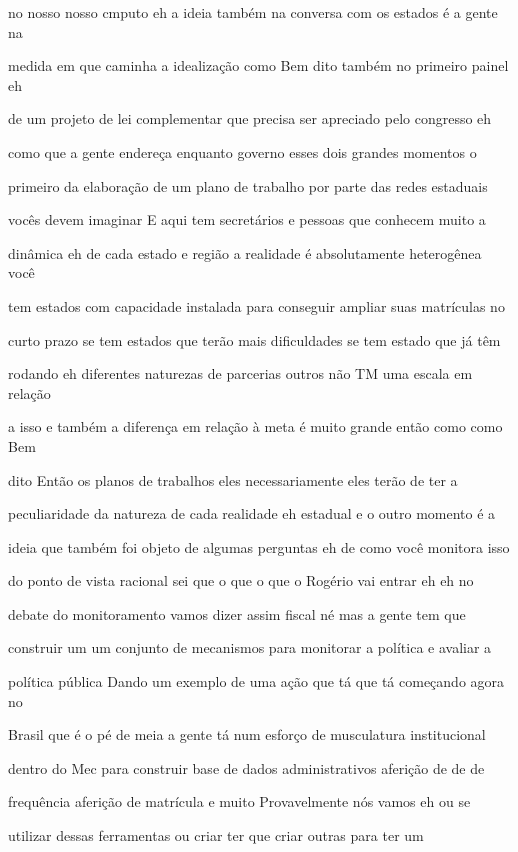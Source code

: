 \documentclass[a4paper,12pt]{article}
\begin{document}
no nosso nosso cmputo eh a ideia também na conversa com os estados é a gente na

medida em que caminha a idealização como Bem dito também no primeiro painel eh

de um projeto de lei complementar que precisa ser apreciado pelo congresso eh

como que a gente endereça enquanto governo esses dois grandes momentos o

primeiro da elaboração de um plano de trabalho por parte das redes estaduais

vocês devem imaginar E aqui tem secretários e pessoas que conhecem muito a

dinâmica eh de cada estado e região a realidade é absolutamente heterogênea você

tem estados com capacidade instalada para conseguir ampliar suas matrículas no

curto prazo se tem estados que terão mais dificuldades se tem estado que já têm

rodando eh diferentes naturezas de parcerias outros não TM uma escala em relação

a isso e também a diferença em relação à meta é muito grande então como como Bem

dito Então os planos de trabalhos eles necessariamente eles terão de ter a

peculiaridade da natureza de cada realidade eh estadual e o outro momento é a

ideia que também foi objeto de algumas perguntas eh de como você monitora isso

do ponto de vista racional sei que o que o que o Rogério vai entrar eh eh no

debate do monitoramento vamos dizer assim fiscal né mas a gente tem que

construir um um conjunto de mecanismos para monitorar a política e avaliar a

política pública Dando um exemplo de uma ação que tá que tá começando agora no

Brasil que é o pé de meia a gente tá num esforço de musculatura institucional

dentro do Mec para construir base de dados administrativos aferição de de de

frequência aferição de matrícula e muito Provavelmente nós vamos eh ou se

utilizar dessas ferramentas ou criar ter que criar outras para ter um
\end{document}
